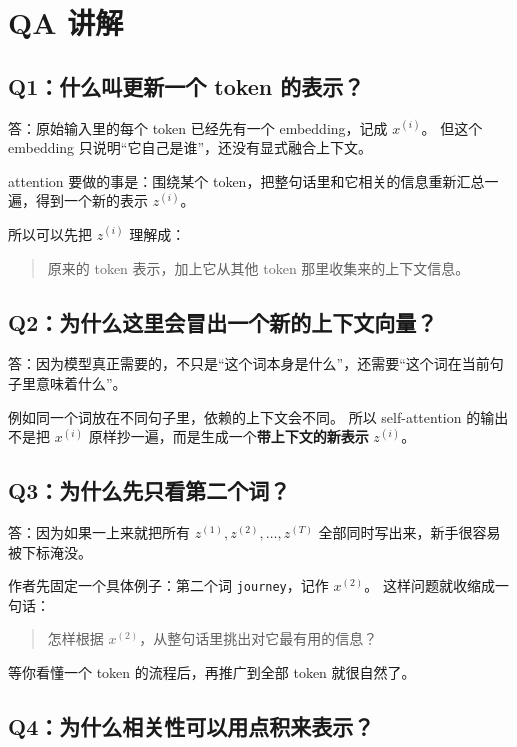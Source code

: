 \documentclass[12pt,a4paper]{ctexart}
\begin{document}
\section{QA 讲解}

\subsection{Q1：什么叫更新一个 token 的表示？}

答：原始输入里的每个 token 已经先有一个 embedding，记成 \(x^{(i)}\)。
但这个 embedding 只说明``它自己是谁''，还没有显式融合上下文。

attention 要做的事是：围绕某个 token，把整句话里和它相关的信息重新汇总一遍，得到一个新的表示 \(z^{(i)}\)。

所以可以先把 \(z^{(i)}\) 理解成：

\begin{quote}
原来的 token 表示，加上它从其他 token 那里收集来的上下文信息。
\end{quote}

\subsection{Q2：为什么这里会冒出一个新的上下文向量？}

答：因为模型真正需要的，不只是``这个词本身是什么''，还需要``这个词在当前句子里意味着什么''。

例如同一个词放在不同句子里，依赖的上下文会不同。
所以 self-attention 的输出不是把 \(x^{(i)}\) 原样抄一遍，而是生成一个\textbf{带上下文的新表示} \(z^{(i)}\)。

\subsection{Q3：为什么先只看第二个词？}

答：因为如果一上来就把所有 \(z^{(1)}, z^{(2)}, \dots, z^{(T)}\) 全部同时写出来，新手很容易被下标淹没。

作者先固定一个具体例子：第二个词 \texttt{journey}，记作 \(x^{(2)}\)。
这样问题就收缩成一句话：

\begin{quote}
怎样根据 \(x^{(2)}\)，从整句话里挑出对它最有用的信息？
\end{quote}

等你看懂一个 token 的流程后，再推广到全部 token 就很自然了。

\subsection{Q4：为什么相关性可以用点积来表示？}
\end{document}
